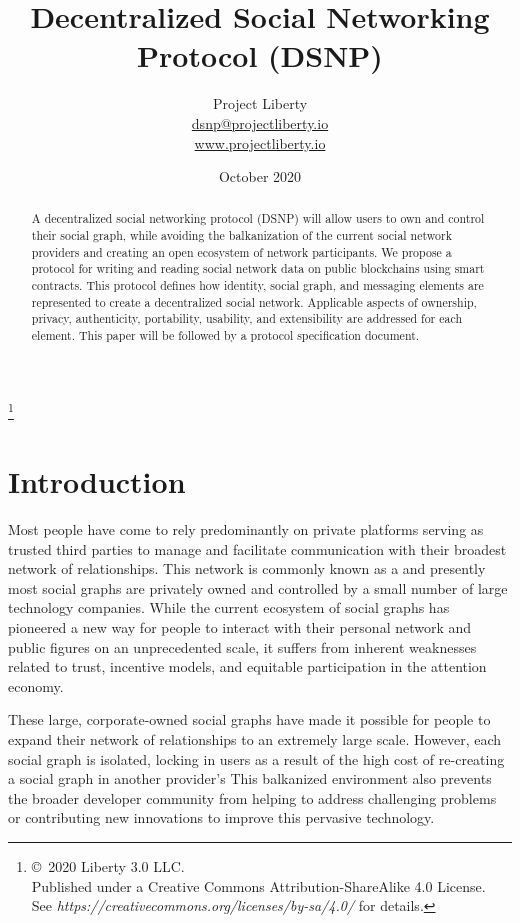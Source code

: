 \documentclass[12pt,letterpaper]{article}
\title{Decentralized Social Networking Protocol (DSNP)}
\author{
	Project Liberty\\
	\href{mailto:dsnp@projectliberty.io}{dsnp@projectliberty.io}\\
	\url{www.projectliberty.io}
}
\date{October 2020}
\newcommand\standalonefootnote[1]{%
  \begingroup
  \renewcommand\thefootnote{}\footnote{#1}%
  \addtocounter{footnote}{-1}%
  \endgroup
}
\begin{document}
\maketitle

\standalonefootnote{\copyright\, 2020 Liberty 3.0 LLC.\\
  Published under a Creative Commons Attribution-ShareAlike 4.0 License.\\
  See \textit{https://creativecommons.org/licenses/by-sa/4.0/} for details.}

\begin{abstract}
	A decentralized social networking protocol (DSNP) will allow users to own and control
	their social graph, while avoiding the balkanization of the current social network
	providers and creating an open ecosystem of network participants. We propose a protocol
	for writing and reading social network data on public blockchains using smart contracts.
	This protocol defines how identity, social graph, and messaging elements are represented
	to create a decentralized social network. Applicable aspects of ownership, privacy,
	authenticity, portability, usability, and extensibility are addressed for each element.
	This paper will be followed by a protocol specification document.
\end{abstract}

\raggedright

\section{Introduction}\label{sec:introduction}

Most people have come to rely predominantly on private platforms serving as trusted third
parties to manage and facilitate communication with their broadest network of
relationships. This network is commonly known as a  and presently most
social graphs are privately owned and controlled by a small number of large technology
companies. While the current ecosystem of social graphs has pioneered a new way for people
to interact with their personal network and public figures on an unprecedented scale, it
suffers from inherent weaknesses related to trust, incentive models, and equitable
participation in the attention economy.

These large, corporate-owned social graphs have made it possible for people to expand
their network of relationships to an extremely large scale. However, each social graph is
isolated, locking in users as a result of the high cost of re-creating a social graph in
another provider's  This balkanized environment also prevents the
broader developer community from helping to address challenging problems or contributing
new innovations to improve this pervasive technology.
\end{document}
